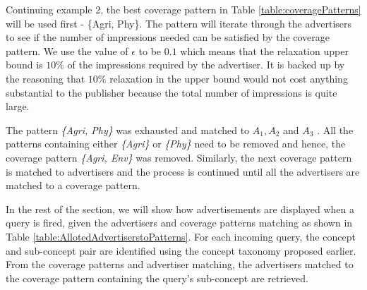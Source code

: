 Continuing example 2, the best coverage pattern in Table \ref{table:coveragePatterns} will be used first - \{Agri, Phy\}. The pattern will iterate through the advertisers to see if the number of impressions needed can be satisfied by the coverage pattern. We use the value of $\epsilon$ to be $0.1$ which means that the relaxation upper bound is $10\%$ of the impressions required by the advertiser. It is backed up by the reasoning that $10\%$ relaxation in the upper bound would not cost anything substantial to the publisher because the total number of impressions is quite large.\par
The pattern {\it \{Agri, Phy\}} was exhausted and matched to $A_{1}, A_{2}$ and $A_{3}$ . All the patterns containing either {\it \{Agri\}} or {\it \{Phy\}} need to be removed and hence, the coverage pattern {\it \{Agri, Env\}} was removed. Similarly, the next coverage pattern is matched to advertisers and the process is continued until all the advertisers are matched to a coverage pattern.
\begin{table}
\centering
\caption{Coverage Pattern and Advertiser Matching \label{table:AllotedAdvertiserstoPatterns}}
\end{table}



In the rest of the section, we will show how advertisements are displayed when a query is fired, given the advertisers and coverage patterns matching as shown in Table \ref{table:AllotedAdvertiserstoPatterns}. For each incoming query, the concept and sub-concept pair are identified using the concept taxonomy proposed earlier. From the coverage patterns and advertiser matching, the advertisers matched to the coverage pattern containing the query's sub-concept are retrieved.

